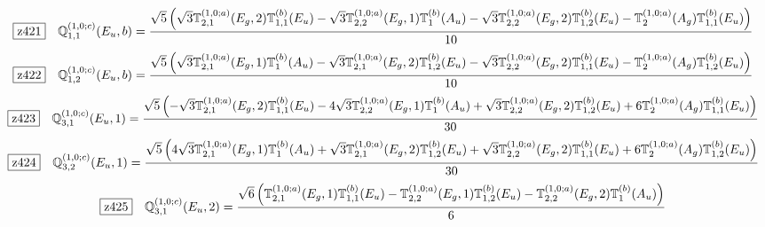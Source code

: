\documentclass[fleqn,10pt,landscape]{jsarticle}
\begin{document}
\begin{dmath*}
\hspace*{3mm}\fbox{z421}\quad \mathbb{Q}_{1,1}^{(1,0;c)}(E_{u},b)=\frac{\sqrt{5} \left(\sqrt{3} \mathbb{T}_{2,1}^{(1,0;a)}(E_{g},2) \mathbb{T}_{1,1}^{(b)}(E_{u}) - \sqrt{3} \mathbb{T}_{2,2}^{(1,0;a)}(E_{g},1) \mathbb{T}_{1}^{(b)}(A_{u}) - \sqrt{3} \mathbb{T}_{2,2}^{(1,0;a)}(E_{g},2) \mathbb{T}_{1,2}^{(b)}(E_{u}) - \mathbb{T}_{2}^{(1,0;a)}(A_{g}) \mathbb{T}_{1,1}^{(b)}(E_{u})\right)}{10}
\end{dmath*}
\begin{dmath*}
\hspace*{3mm}\fbox{z422}\quad \mathbb{Q}_{1,2}^{(1,0;c)}(E_{u},b)=\frac{\sqrt{5} \left(\sqrt{3} \mathbb{T}_{2,1}^{(1,0;a)}(E_{g},1) \mathbb{T}_{1}^{(b)}(A_{u}) - \sqrt{3} \mathbb{T}_{2,1}^{(1,0;a)}(E_{g},2) \mathbb{T}_{1,2}^{(b)}(E_{u}) - \sqrt{3} \mathbb{T}_{2,2}^{(1,0;a)}(E_{g},2) \mathbb{T}_{1,1}^{(b)}(E_{u}) - \mathbb{T}_{2}^{(1,0;a)}(A_{g}) \mathbb{T}_{1,2}^{(b)}(E_{u})\right)}{10}
\end{dmath*}
\begin{dmath*}
\hspace*{3mm}\fbox{z423}\quad \mathbb{Q}_{3,1}^{(1,0;c)}(E_{u},1)=\frac{\sqrt{5} \left(- \sqrt{3} \mathbb{T}_{2,1}^{(1,0;a)}(E_{g},2) \mathbb{T}_{1,1}^{(b)}(E_{u}) - 4 \sqrt{3} \mathbb{T}_{2,2}^{(1,0;a)}(E_{g},1) \mathbb{T}_{1}^{(b)}(A_{u}) + \sqrt{3} \mathbb{T}_{2,2}^{(1,0;a)}(E_{g},2) \mathbb{T}_{1,2}^{(b)}(E_{u}) + 6 \mathbb{T}_{2}^{(1,0;a)}(A_{g}) \mathbb{T}_{1,1}^{(b)}(E_{u})\right)}{30}
\end{dmath*}
\begin{dmath*}
\hspace*{3mm}\fbox{z424}\quad \mathbb{Q}_{3,2}^{(1,0;c)}(E_{u},1)=\frac{\sqrt{5} \left(4 \sqrt{3} \mathbb{T}_{2,1}^{(1,0;a)}(E_{g},1) \mathbb{T}_{1}^{(b)}(A_{u}) + \sqrt{3} \mathbb{T}_{2,1}^{(1,0;a)}(E_{g},2) \mathbb{T}_{1,2}^{(b)}(E_{u}) + \sqrt{3} \mathbb{T}_{2,2}^{(1,0;a)}(E_{g},2) \mathbb{T}_{1,1}^{(b)}(E_{u}) + 6 \mathbb{T}_{2}^{(1,0;a)}(A_{g}) \mathbb{T}_{1,2}^{(b)}(E_{u})\right)}{30}
\end{dmath*}
\begin{dmath*}
\hspace*{3mm}\fbox{z425}\quad \mathbb{Q}_{3,1}^{(1,0;c)}(E_{u},2)=\frac{\sqrt{6} \left(\mathbb{T}_{2,1}^{(1,0;a)}(E_{g},1) \mathbb{T}_{1,1}^{(b)}(E_{u}) - \mathbb{T}_{2,2}^{(1,0;a)}(E_{g},1) \mathbb{T}_{1,2}^{(b)}(E_{u}) - \mathbb{T}_{2,2}^{(1,0;a)}(E_{g},2) \mathbb{T}_{1}^{(b)}(A_{u})\right)}{6}
\end{dmath*}
\end{document}
